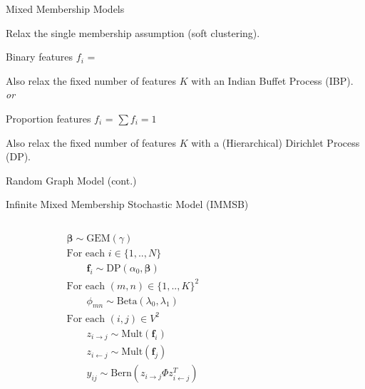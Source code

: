 \begin{frame}[c]{Mixed Membership Models}

    Relax the single membership assumption (soft clustering).

    \begin{block}{Binary features}
        $f_i$ = \raisebox{-2pt}{}
    \end{block}
    Also relax the fixed number of features $K$ with an Indian Buffet Process (IBP). \\

    \vspace{0.2cm}
    \emph{or}
    \vspace{0.2cm}

    \begin{block}{Proportion features}
        $f_i$ = \raisebox{-2pt}{} \hspace{2em} $\sum f_i=1$
    \end{block}
    Also relax the fixed number of features $K$ with a (Hierarchical) Dirichlet Process (DP). \\
    
\end{frame}

\begin{frame}[c]{Random Graph Model (cont.)}

    Infinite Mixed Membership Stochastic Model (IMMSB) 
    \vspace{1cm}

    \begin{columns}[t]
        \begin{column}{0.5\textwidth}
            \vspace{-5cm}
            \begin{align*}
                &\bm{\beta} \sim \textrm{GEM}(\gamma)\\
                &\textrm{For each } i \in \{1, .., N\}  \\
                &\qquad\bm{f}_i \sim \textrm{DP}(\alpha_0, \bm{\beta})\\
                &\textrm{For each }  (m,n) \in \{1,..,K\}^2 \\
                &\qquad\phi_{mn} \sim \mathrm{Beta}(\lambda_0,\lambda_1)\\
                &\textrm{For each } (i,j) \in V^2 \\
                &\qquad z_{i \rightarrow j} \sim \mbox{Mult}(\bm{f}_i)\\
                &\qquad z_{i \leftarrow j} \sim \mbox{Mult}(\bm{f}_j)\\
                &\qquad y_{ij} \sim \mathrm{Bern}({z_{i \rightarrow j} \Phi z_{i \leftarrow j}^T})
            \end{align*}
        \end{column}
        \begin{column}{0.5\textwidth}
            \scalebox{0.88}{}
        \end{column}
    \end{columns}

\end{frame}

